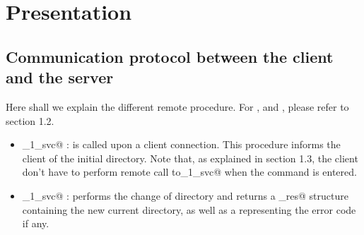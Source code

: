 \documentclass{article}
\begin{document}
\section{Presentation}
\subsection{Communication protocol between the client and the server}
Here shall we explain the different remote procedure. For \verb@get@, \verb@ls@ and \verb@put@, please refer to section 1.2.
\begin{itemize}
\item \verb@rpwd_1_svc@ : is called upon a client connection. This procedure informs the client of the initial directory. Note that, as explained in section 1.3, the client don't have to perform remote call to\verb@rpwd_1_svc@ when the \verb@pwd@ command is entered.
\item \verb@rcd_1_svc@ : performs the change of directory and returns a \verb@cd_res@ structure containing the new current directory, as well as a \verb@int@ representing the error code if any.
\end{itemize}
\end{document}
